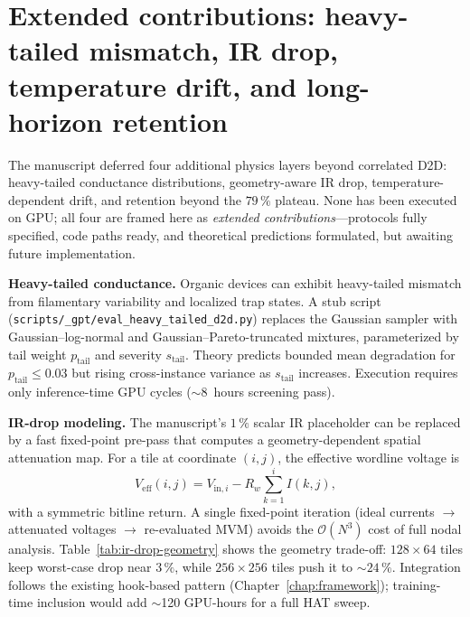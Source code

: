 \section{Extended contributions: heavy-tailed mismatch, IR drop, temperature drift, and long-horizon retention}
\label{sec:extended-four}

The manuscript deferred four additional physics layers beyond correlated D2D: heavy-tailed conductance distributions, geometry-aware IR drop, temperature-dependent drift, and retention beyond the $79\,\%$ plateau.  None has been executed on GPU; all four are framed here as \emph{extended contributions}---protocols fully specified, code paths ready, and theoretical predictions formulated, but awaiting future implementation.

\label{sec:heavy-tailed}
\textbf{Heavy-tailed conductance.}  Organic devices can exhibit heavy-tailed mismatch from filamentary variability and localized trap states.  A stub script (\texttt{scripts/\_gpt/eval\_heavy\_tailed\_d2d.py}) replaces the Gaussian sampler with Gaussian--log-normal and Gaussian--Pareto-truncated mixtures, parameterized by tail weight $p_{\text{tail}}$ and severity $s_{\text{tail}}$.  Theory predicts bounded mean degradation for $p_{\text{tail}} \le 0.03$ but rising cross-instance variance as $s_{\text{tail}}$ increases.  Execution requires only inference-time GPU cycles ($\sim$8~hours screening pass).

\textbf{IR-drop modeling.}  The manuscript's $1\,\%$ scalar IR placeholder can be replaced by a fast fixed-point pre-pass that computes a geometry-dependent spatial attenuation map.  For a tile at coordinate $(i,j)$, the effective wordline voltage is
\begin{equation}
    V_{\text{eff}}(i,j) = V_{\text{in},i} - R_{w} \sum_{k=1}^{i} I(k,j),
    \label{eq:ir-drop-wordline}
\end{equation}
with a symmetric bitline return.  A single fixed-point iteration (ideal currents $\rightarrow$ attenuated voltages $\rightarrow$ re-evaluated MVM) avoids the $\mathcal{O}(N^{3})$ cost of full nodal analysis.  Table~\ref{tab:ir-drop-geometry} shows the geometry trade-off: $128 \times 64$ tiles keep worst-case drop near $3\,\%$, while $256 \times 256$ tiles push it to $\sim$$24\,\%$.  Integration follows the existing hook-based pattern (Chapter~\ref{chap:framework}); training-time inclusion would add $\sim$120 GPU-hours for a full HAT sweep.

